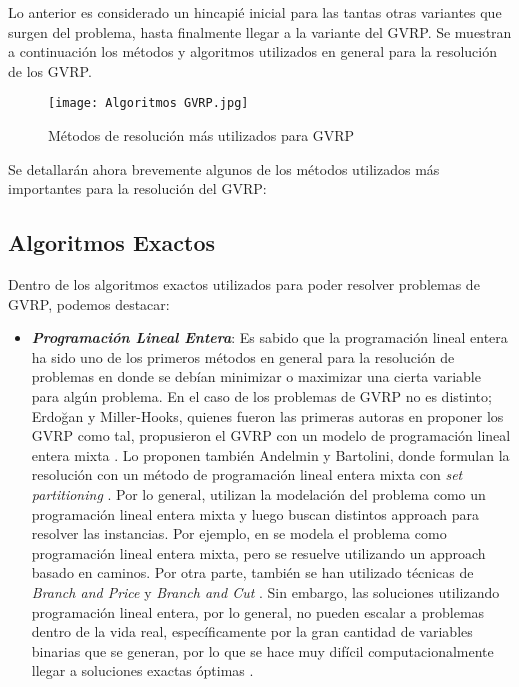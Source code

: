 \documentclass[letter, 10pt]{article}
\begin{document}
Lo anterior es considerado un hincapié inicial para las tantas otras variantes que surgen del problema, hasta finalmente llegar a la variante del GVRP. 
Se muestran a continuación los métodos y algoritmos utilizados en general para la resolución de los GVRP.\\

\begin{figure}[h]
    \centering
    \texttt{[image: Algoritmos GVRP.jpg]}
    \caption{Métodos de resolución más utilizados para GVRP  \cite{SYSTEMATICLITERATURE}}
    \label{fig:figura1}
\end{figure}

Se detallarán ahora brevemente algunos de los métodos utilizados más importantes para la resolución del GVRP:

\subsection{Algoritmos Exactos}
Dentro de los algoritmos exactos utilizados para poder resolver problemas de GVRP, podemos destacar:
\begin{itemize}
    \item \textbf{\emph{Programación Lineal Entera}}: Es sabido que la programación lineal entera ha sido uno de los primeros métodos en general para la resolución de problemas en donde se debían minimizar o maximizar una cierta variable para algún problema. En el caso de los problemas de GVRP no es distinto; Erdoğan y Miller-Hooks, quienes fueron las primeras autoras en proponer los GVRP como tal, propusieron el GVRP con un modelo de programación lineal entera mixta \cite{ERDOGANMILLERHOOKS}. Lo proponen también Andelmin y Bartolini, donde formulan la resolución con un método de programación lineal entera mixta con \emph{set partitioning} \cite{EXACTALGORITHM}. Por lo general, utilizan la modelación del problema como un programación lineal entera mixta y luego buscan distintos approach para resolver las instancias. Por ejemplo, en \cite{BRUGLIERI2019109} se modela el problema como programación lineal entera mixta, pero se resuelve utilizando un approach basado en caminos. Por otra parte, también se han utilizado técnicas de \emph{Branch and Price} \cite{BRANCHANDPRICE} y \emph{Branch and Cut} \cite{CHENG201797}. Sin embargo, las soluciones utilizando programación lineal entera, por lo general, no pueden escalar a problemas dentro de la vida real, específicamente por la gran cantidad de variables binarias que se generan, por lo que se hace muy difícil computacionalmente llegar a soluciones exactas óptimas \cite{LAPORTE1992345}.

\end{itemize}
\end{document}
